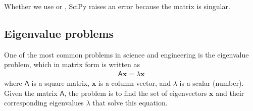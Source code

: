 \documentclass[letterpaper,10pt,english]{sphinxmanual}
\begin{document}
\begin{sphinxVerbatim}[commandchars=\\\{\},numbers=left,firstnumber=1,stepnumber=1]
\PYG{p}{[}\PYG{p}{]}  \PYG{p}{[}  \PYG{p}{]}

\PYG{p}{[}\PYG{p}{[}     \PYG{p}{]}
\PYG{g+go}{                [ 1,  2,  3]])}


  
\end{sphinxVerbatim}

\sphinxAtStartPar
Whether we use  or , SciPy raises an error because the matrix is singular.

\ignorespaces 

\subsection{Eigenvalue problems}
\label{\detokenize{chap9/chap9_scipy:eigenvalue-problems}}\label{\detokenize{chap9/chap9_scipy:index-8}}
\sphinxAtStartPar
One of the most common problems in science and engineering is the eigenvalue problem, which in matrix form is written as
\begin{equation*}
\begin{split}\mathsf{A}\mathbf{x} = \lambda \mathbf{x}\end{split}
\end{equation*}
\sphinxAtStartPar
where \(\mathsf{A}\) is a square matrix, \(\mathbf{x}\) is a column vector, and \(\lambda\) is a scalar (number).   Given the matrix \(\mathsf{A}\), the problem is to find the set of eigenvectors \(\mathbf{x}\) and their corresponding eigenvalues \(\lambda\) that solve this equation.
\end{document}

